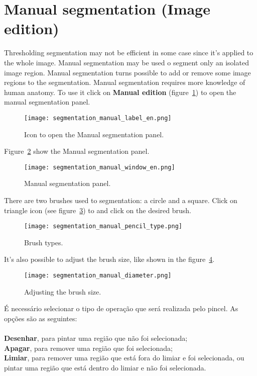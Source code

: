 \section{Manual segmentation (Image edition)}

Thresholding segmentation may not be efficient in some case since it's applied to the whole image. Manual segmentation may be used o segment only an isolated image region. Manual segmentation turns possible to add or remove some image regions to the segmentation. Manual segmentation requires more knowledge of  human anatomy. To use it click on \textbf{Manual edition} (figure~\ref{fig:advanced_edition}) to open the manual segmentation panel.

\begin{figure}[!htb]
\centering
\texttt{[image: segmentation\_manual\_label\_en.png]}
\caption{Icon to open the Manual segmentation panel.}
\label{fig:advanced_edition}
\end{figure}

Figure~\ref{fig:edition_slices_ref} show the Manual segmentation panel.

\begin{figure}[!htb]
\centering
\texttt{[image: segmentation\_manual\_window\_en.png]}
\caption{Manual segmentation panel.}
\label{fig:edition_slices_ref}
\end{figure}

There are two brushes used to segmentation: a circle and a square. Click on triangle icon (see figure~\ref{fig:brush_type}) to and click on the desired brush.

\begin{figure}[!htb]
\centering
\texttt{[image: segmentation\_manual\_pencil\_type.png]}
\caption{Brush types.}
\label{fig:brush_type}
\end{figure}

\newpage

It's also possible to adjust the brush size, like shown in the figure~\ref{fig:select_diameter}.

\begin{figure}[!htb]
\centering
\texttt{[image: segmentation\_manual\_diameter.png]}
\caption{Adjusting the brush size.}
\label{fig:select_diameter}
\end{figure}

É necessário selecionar o tipo de operação que será realizada pelo pincel. As opções são as
seguintes:\\
\\
\textbf{Desenhar}, para pintar uma região que não foi selecionada;\\
\textbf{Apagar}, para remover uma região que foi selecionada;\\
\textbf{Limiar}, para remover uma região que está fora do limiar e foi selecionada, ou pintar
uma região que está dentro do limiar e não foi selecionada.\\


